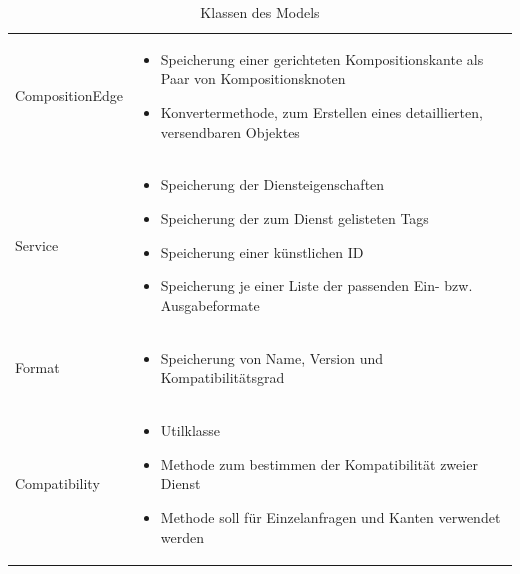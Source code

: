 \begin{table}[h]
\begin{tabularx}{\textwidth}{p{} | X}
		\rowcolor[HTML]{E7E7E7}
		CompositionEdge & \compress \begin{itemize}
			\item Speicherung einer gerichteten Kompositionskante als Paar von Kompositionsknoten
			\item Konvertermethode, zum Erstellen eines detaillierten, versendbaren Objektes
		\end{itemize} \\
		Service & \compress \begin{itemize}
			\item Speicherung der Diensteigenschaften
			\item Speicherung der zum Dienst gelisteten Tags
			\item Speicherung einer künstlichen ID
			\item Speicherung je einer Liste der passenden Ein- bzw. Ausgabeformate
		\end{itemize} \\
		\rowcolor[HTML]{E7E7E7}
		Format & \compress \begin{itemize}
			\item Speicherung von Name, Version und Kompatibilitätsgrad
		\end{itemize} \\
		Compatibility & \compress \begin{itemize}
			\item Utilklasse
			\item Methode zum bestimmen der Kompatibilität zweier Dienst
			\item Methode soll für Einzelanfragen und Kanten verwendet werden
		\end{itemize} \\
	\end{tabularx}
	\caption{Klassen des Models}
	\label{table:klassenbeschreibung-a}
\end{table}

